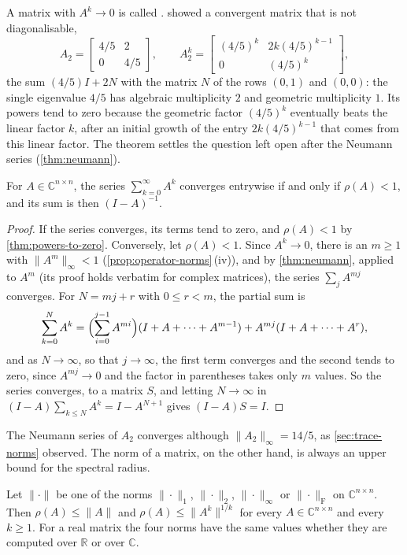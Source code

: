 A matrix with $A^k\to0$ is called .  showed a convergent matrix that is not diagonalisable,
\[
A_2=\begin{bmatrix}4/5&2\\0&4/5\end{bmatrix},\qquad A_2^k=\begin{bmatrix}(4/5)^k&2k(4/5)^{k-1}\\0&(4/5)^k\end{bmatrix},
\]
the sum $(4/5)I+2N$ with the matrix $N$ of the rows $(0,1)$ and $(0,0)$: the single eigenvalue $4/5$ has algebraic multiplicity $2$ and geometric multiplicity $1$. Its powers tend to zero because the geometric factor $(4/5)^k$ eventually beats the linear factor $k$, after an initial growth of the entry $2k(4/5)^{k-1}$ that comes from this linear factor. The theorem settles the question left open after the Neumann series (\cref{thm:neumann}).

\begin{corollary}
\label{cor:neumann-spectral}
For $A\in\mathbb C^{n\times n}$, the series $\sum_{k=0}^\infty A^k$ converges entrywise if and only if $\rho(A)<1$, and its sum is then $(I-A)^{-1}$.
\end{corollary}

\begin{proof}
If the series converges, its terms tend to zero, and $\rho(A)<1$ by \cref{thm:powers-to-zero}. Conversely, let $\rho(A)<1$. Since $A^k\to0$, there is an $m\ge1$ with $\|A^m\|_\infty<1$ (\cref{prop:operator-norms}\,(iv)), and by \cref{thm:neumann}, applied to $A^m$ (its proof holds verbatim for complex matrices), the series $\sum_jA^{mj}$ converges. For $N=mj+r$ with $0\le r<m$, the partial sum is
\[
\sum_{k=0}^NA^k=\Bigl(\sum_{i=0}^{j-1}A^{mi}\Bigr)(I+A+\cdots+A^{m-1})+A^{mj}(I+A+\cdots+A^r),
\]
and as $N\to\infty$, so that $j\to\infty$, the first term converges and the second tends to zero, since $A^{mj}\to0$ and the factor in parentheses takes only $m$ values. So the series converges, to a matrix $S$, and letting $N\to\infty$ in $(I-A)\sum_{k\le N}A^k=I-A^{N+1}$ gives $(I-A)S=I$.
\end{proof}

The Neumann series of $A_2$ converges although $\|A_2\|_\infty=14/5$, as \cref{sec:trace-norms} observed. The norm of a matrix, on the other hand, is always an upper bound for the spectral radius.

\begin{proposition}
\label{prop:spectral-radius-norm}
Let $\|\cdot\|$ be one of the norms $\|\cdot\|_1$, $\|\cdot\|_2$, $\|\cdot\|_\infty$ or $\|\cdot\|_{\mathrm F}$ on $\mathbb C^{n\times n}$. Then $\rho(A)\le\|A\|$ and $\rho(A)\le\|A^k\|^{1/k}$ for every $A\in\mathbb C^{n\times n}$ and every $k\ge1$. For a real matrix the four norms have the same values whether they are computed over $\mathbb R$ or over $\mathbb C$.
\end{proposition}

